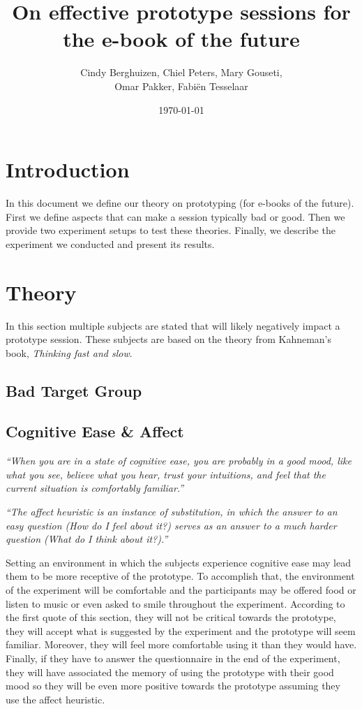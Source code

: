 \documentclass{article}
\title{On effective prototype sessions for the e-book of the future}
\author{Cindy Berghuizen, Chiel Peters, Mary Gouseti,\\ Omar Pakker, Fabi\"en Tesselaar}
\date{\today}
\begin{document}
\maketitle

\section{Introduction}
In this document we define our theory on prototyping (for e-books of the future). First we define aspects that can make a session typically bad or good. Then we provide two experiment setups to test these theories. Finally, we describe the experiment we conducted and present its results.

\section{Theory}
In this section multiple subjects are stated that will likely negatively impact a prototype session. These subjects are based on the theory from Kahneman's book, \emph{Thinking fast and slow}.

\subsection{Bad Target Group}

\subsection{Cognitive Ease \& Affect}
\emph{``When you are in a state of cognitive ease, you are probably in a good mood, like what you see, believe what you hear, trust your intuitions, and feel that the current situation is comfortably familiar.''}

\emph{``The affect heuristic is an instance of substitution, in which the answer to an easy question (How do I feel about it?) serves as an answer to a much harder question (What do I think about it?).''}

Setting an environment in which the subjects experience cognitive ease may lead them to be more receptive of the prototype. To accomplish that, the environment of the experiment will be comfortable and the participants may be offered food or listen to music or even asked to smile throughout the experiment. According to the first quote of this section, they will not be critical towards the prototype, they will accept what is suggested by the experiment and the prototype will seem familiar. Moreover, they will feel more comfortable using it than they would have. Finally, if they have to answer the questionnaire in the end of the experiment, they will have associated the memory of using the prototype with their good mood so they will be even more positive towards the prototype assuming they use the affect heuristic.
\end{document}
